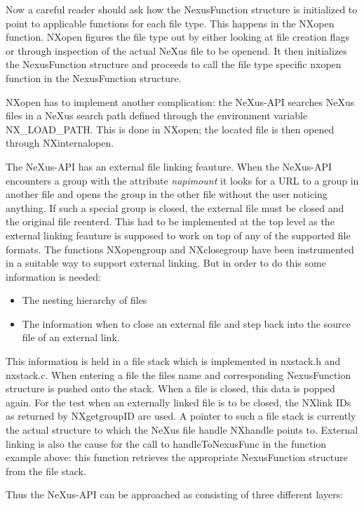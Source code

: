 \documentclass[a4paper]{article}
\begin{document}
Now a careful reader should ask how the NexusFunction structure is initialized to point to  
applicable functions for each file type. This happens in the NXopen function. NXopen figures the 
file type out by either looking at file creation flags or through inspection of the actual NeXus 
file to be openend. It then initializes the NexusFunction structure and proceeds to call the 
file type specific nxopen function in the NexusFunction structure.    


NXopen has to implement another complication: the NeXus-API searches NeXus files in a NeXus search path 
defined through the environment variable NX\_LOAD\_PATH. This is done in NXopen; the located file is 
then opened through NXinternalopen.


The NeXus-API has an external file linking feauture. When the NeXus-API encounters a group with the 
attribute {\it  napimount} it looks for a URL to a group in another file and opens the group in the 
other file without the user noticing anything. If such a special group is closed, the external file 
must be closed and the original file reenterd.  This had to be implemented at the top level as 
the external linking feauture is supposed to work on top of any of the supported file formats. The 
functions NXopengroup and NXclosegroup have been instrumented in a suitable way to support external 
linking. But in order to do this some information is needed:


\begin{itemize}\item The nesting hierarchy of files
\item The information when to close an external file and step back into the source file of an 
 external link.
\end{itemize}This information is held in a file stack which is implemented in nxstack.h and nxstack.c. When 
entering a file the files name and corresponding NexusFunction structure is pushed onto the stack. 
When a file is closed, this data is popped again. For the test when an externally linked  file is 
to be closed, the NXlink IDs as returned by NXgetgroupID are used. A pointer to such a file stack 
is currently the actual structure to which the NeXus file handle NXhandle points to. External 
linking is also the cause for the call to handleToNexusFunc in the function example above: this
function retrieves the appropriate NexusFunction structure from the file stack.    


Thus the NeXus-API can be approached as consisting of three different layers:
\end{document}
